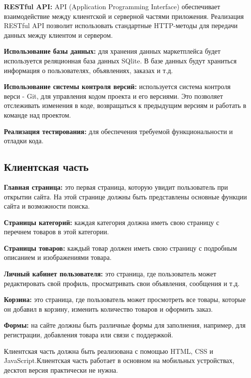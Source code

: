     \textbf{RESTful API:} API (Application Programming Interface) обеспечивает взаимодействие между клиентской и серверной частями приложения. Реализация RESTful API позволит использовать стандартные HTTP-методы для передачи данных между клиентом и сервером.

    \textbf{Использование базы данных:} для хранения данных маркетплейса будет используется реляционная база данных SQlite. В базе данных будут храниться информация о пользователях, объявлениях, заказах и т.д.

    \textbf{Использование системы контроля версий:} используется система контроля верси - Git, для управления кодом проекта и его версиями. Это позволяет отслеживать изменения в коде, возвращаться к предыдущим версиям и работать в команде над проектом.

    \textbf{Реализация тестирования:} для обеспечения требуемой функциональности и отладки кода.


\subsection{Клиентская часть}
    \textbf{Главная страница:} это первая страница, которую увидит пользователь при открытии сайта. На этой странице должны быть представлены основные функции сайта и возможности поиска.

    \textbf{Страницы категорий:} каждая категория должна иметь свою страницу с перечнем товаров в этой категории.

    \textbf{Страницы товаров:} каждый товар должен иметь свою страницу с подробным описанием и изображениями товара.

    \textbf{Личный кабинет пользователя:} это страница, где пользователь может редактировать свой профиль, просматривать свои объявления, сообщения и т.д.

    \textbf{Корзина:} это страница, где пользователь может просмотреть все товары, которые он добавил в корзину, изменить количество товаров и оформить заказ.

    \textbf{Формы:} на сайте должны быть различные формы для заполнения, например, для регистрации, добавления товара или связи с поддержкой.

    Клиентская часть должна быть реализована с помощью HTML, CSS и JavaScript.Клиентская часть работает в основном на мобильных устройствах, десктоп версия практически не нужна.













